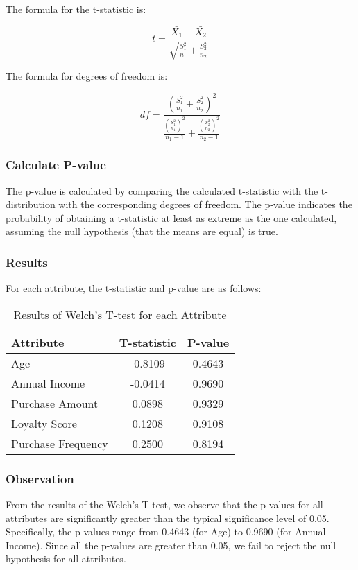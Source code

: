 \documentclass[11pt]{article}
\begin{document}
The formula for the t-statistic is:

\[
t = \frac{\bar{X_1} - \bar{X_2}}{\sqrt{\frac{S_1^2}{n_1} + \frac{S_2^2}{n_2}}}
\]

The formula for degrees of freedom is:

\[
df = \frac{\left( \frac{S_1^2}{n_1} + \frac{S_2^2}{n_2} \right)^2}{\frac{\left( \frac{S_1^2}{n_1} \right)^2}{n_1 - 1} + \frac{\left( \frac{S_2^2}{n_2} \right)^2}{n_2 - 1}}
\]

\subsubsection{Calculate P-value}

The p-value is calculated by comparing the calculated t-statistic with the t-distribution with the corresponding degrees of freedom. The p-value indicates the probability of obtaining a t-statistic at least as extreme as the one calculated, assuming the null hypothesis (that the means are equal) is true.

\subsubsection{Results}

For each attribute, the t-statistic and p-value are as follows:

\begin{table}[H]
\centering
\begin{tabular}{|l|c|c|}
    \hline
    \textbf{Attribute} & \textbf{T-statistic} & \textbf{P-value} \\
    \hline
    Age & -0.8109 & 0.4643 \\
    \hline
    Annual Income & -0.0414 & 0.9690 \\
    \hline
    Purchase Amount & 0.0898 & 0.9329 \\
    \hline
    Loyalty Score & 0.1208 & 0.9108 \\
    \hline
    Purchase Frequency & 0.2500 & 0.8194 \\
    \hline
\end{tabular}
\caption{Results of Welch's T-test for each Attribute}
\end{table}

\subsubsection{Observation}

From the results of the Welch's T-test, we observe that the p-values for all attributes are significantly greater than the typical significance level of 0.05. Specifically, the p-values range from 0.4643 (for Age) to 0.9690 (for Annual Income). Since all the p-values are greater than 0.05, we fail to reject the null hypothesis for all attributes.
\end{document}
